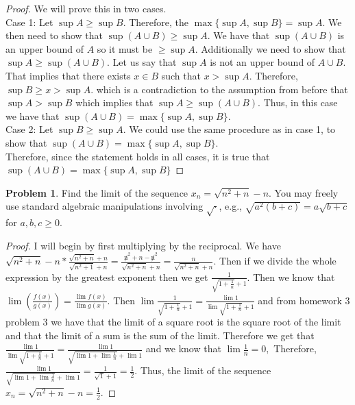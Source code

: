 \documentclass[11pt]{article}
\theoremstyle{definition}
\newtheorem{problem}{Problem}
\begin{document}
\begin{proof}
We will prove this in two cases.\\
Case 1: Let $\sup A \geq \sup B$. Therefore, the $\max\{\sup A, \sup B\} = \sup A$. We then need to show that $\sup (A\cup B) \geq \sup A$. We have that $\sup (A\cup B)$ is an upper bound of $A$ so it must be $\geq \sup A.$ Additionally we need to show that $\sup A \geq \sup(A\cup B)$. Let us say that $\sup A$ is not an upper bound of $A\cup B$. That implies that there exists $x\in B$ such that $x > \sup A$. Therefore, $\sup B \geq x> \sup A.$ which is a contradiction to the assumption from before that $\sup A > \sup B$ which implies that $\sup A \geq \sup (A\cup B).$ Thus, in this case we have that $\sup(A\cup B) =\max\{\sup A, \sup B\}$.\\
Case 2: Let $\sup B \geq \sup A$. We could use the same procedure as in case 1, to show that $\sup (A\cup B) = \max\{\sup A, \sup B\}$.\\
Therefore, since the statement holds in all cases, it is true that $\sup(A\cup B) = \max\{\sup A, \sup B\}$
\end{proof}

\newpage
\begin{problem}
Find the limit of the sequence $x_n = \sqrt{n^2 + n} - n$. You may freely use standard algebraic manipulations involving $\sqrt{\cdot}$, e.g., $\sqrt{a^2 ( b + c)} = a \sqrt{b + c}$ for $a, b,c \geq 0$. 
\end{problem}

\begin{proof}
I will begin by first multiplying by the reciprocal. We have $\sqrt{n^2+n} - n * \frac{\sqrt{n^2+n}+n}{\sqrt{n^2+1}+n} = \frac{\not n^2 + n - \not n^2}{\sqrt{n^2+n}+n} = \frac{n}{\sqrt{n^2+n}+n}$. Then if we divide the whole expression by the greatest exponent then we get $\frac{1}{\sqrt{1+\frac{1}{n}}+1}$. Then we know that $\lim(\frac{f(x)}{g(x)}) = \frac{\lim f(x)}{\lim g(x)}.$ Then $\lim \frac{1}{\sqrt{1+\frac{1}{n}}+1} = \frac{\lim 1}{\lim \sqrt{1+\frac{1}{n}}+1}$ and from homework 3 problem 3 we have that the limit of a square root is the square root of the limit and that the limit of a sum is the sum of the limit. Therefore we get that $\frac{\lim 1}{\lim \sqrt{1+\frac{1}{n}}+1} = \frac{\lim 1}{\sqrt{\lim 1 + \lim \frac{1}{n}}+\lim 1}$ and we know that $\lim \frac{1}{n} = 0,$ Therefore, $\frac{\lim 1}{\sqrt{\lim 1 + \lim \frac{1}{n}}+\lim 1} = \frac{1}{\sqrt{1}+1} = \frac{1}{2}.$ Thus, the limit of the sequence $x_n = \sqrt{n^2+n}-n = \frac{1}{2}.$
\end{proof}
\end{document}
